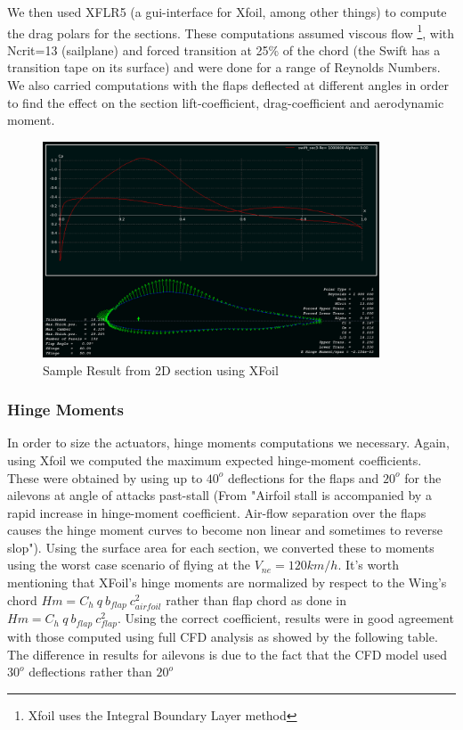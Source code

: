 \documentclass[titlepage,10pt]{article}
\begin{document}
We then used XFLR5 (a gui-interface for Xfoil, among other things) to compute the drag polars for the sections. These computations assumed viscous flow \footnote{Xfoil uses the Integral Boundary Layer method}, with Ncrit=13 (sailplane) and forced transition at 25\% of the chord (the Swift has a transition tape on its surface) and were done for a range of Reynolds Numbers. We also carried computations with the flaps deflected at different angles in order to find the effect on the section lift-coefficient, drag-coefficient and aerodynamic moment.

\begin{figure}[bht]
\begin{center}
\includegraphics[width = 100mm]{xfoil_section.png}
\end{center}
\caption{Sample Result from 2D section using XFoil}
\label{xfoil}
\end{figure}

\subsubsection{Hinge Moments}
In order to size the actuators, hinge moments computations we necessary. Again, using Xfoil we computed the maximum expected hinge-moment coefficients. These were obtained by using up to $40^o$ deflections for the flaps and $20^o$ for the ailevons at angle of attacks past-stall (From \cite{NACA9} "Airfoil stall is accompanied by a rapid increase in hinge-moment coefficient. Air-flow separation over the flaps causes the hinge moment curves to become non linear and sometimes to reverse slop"). Using the surface area for each section, we converted these to moments using the worst case scenario of flying at the $V_{ne}=120km/h$. It's worth mentioning that XFoil's hinge moments are normalized by respect to the Wing's chord $Hm = C_h\ q\  b_{flap}\ c_{airfoil}^2$ rather than flap chord as done in \cite{Etkin} $Hm = C_h\ q\ b_{flap}\ c_{flap}^2$. Using the correct coefficient, results were in good agreement with those computed using full CFD analysis as showed by the following table. The difference in results for ailevons is due to the fact that the CFD model used $30^o$ deflections rather than $20^o$
\end{document}
